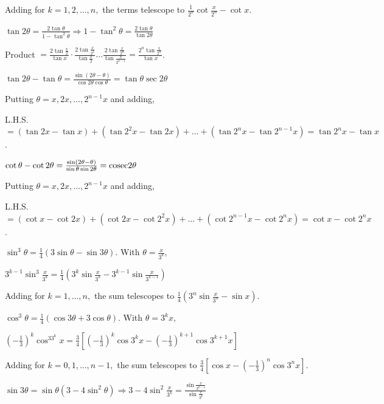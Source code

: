   Adding for $k = 1, 2, \ldots, n,$ the terms telescope to $\frac{1}{2^n}\cot\frac{x}{2^n} - \cot x$.

\item $\tan2\theta = \frac{2\tan\theta}{1 - \tan^2\theta} \Rightarrow 1 - \tan^2\theta = \frac{2\tan\theta}{\tan2\theta}$

  Product $= \frac{2\tan\frac{x}{2}}{\tan x}\cdot\frac{2\tan\frac{x}{2^2}}{\tan\frac{x}{2}}\ldots\frac{2\tan\frac{x}{2^n}}{\tan\frac{x}{2^{n
  - 1}}} = \frac{2^n\tan\frac{x}{2^n}}{\tan x}$.

\item $\tan2\theta - \tan\theta = \frac{\sin(2\theta - \theta)}{\cos2\theta\cos\theta} = \tan\theta\sec2\theta$

  Putting $\theta = x, 2x, \ldots, 2^{n - 1}x$ and adding,

  L.H.S. $= (\tan2x - \tan x) + (\tan2^2x - \tan2x) + \ldots + (\tan2^nx - \tan2^{n - 1}x) = \tan2^nx - \tan x$.

\item $\cot\theta - \cot2\theta = \frac{\sin(2\theta - \theta)}{\sin\theta\sin2\theta} = {\rm cosec} 2\theta$

  Putting $\theta = x, 2x, \ldots, 2^{n - 1}x$ and adding,

  L.H.S. $= (\cot x - \cot2x) + (\cot2x - \cot2^2x) + \ldots + (\cot2^{n - 1}x - \cot2^nx) = \cot x - \cot2^nx$.

\item $\sin^3\theta = \frac{1}{4}(3\sin\theta - \sin3\theta)$. With $\theta = \frac{x}{3^k},$

  $3^{k - 1}\sin^3\frac{x}{3^k} = \frac{1}{4}\left(3^k\sin\frac{x}{3^k} - 3^{k - 1}\sin\frac{x}{3^{k - 1}}\right)$

  Adding for $k = 1, \ldots, n,$ the sum telescopes to $\frac{1}{4}\left(3^n\sin\frac{x}{3^n} - \sin x\right)$.

\item $\cos^3\theta = \frac{1}{4}(\cos3\theta + 3\cos\theta)$. With $\theta = 3^kx,$

  $\left(-\frac{1}{3}\right)^k\cos^33^kx = \frac{3}{4}\left[\left(-\frac{1}{3}\right)^k\cos3^kx - \left(-\frac{1}{3}\right)^{k +
  1}\cos3^{k + 1}x\right]$

  Adding for $k = 0, 1, \ldots, n - 1,$ the sum telescopes to $\frac{3}{4}\left[\cos x - \left(-\frac{1}{3}\right)^n\cos3^nx\right]$.

\item $\sin3\theta = \sin\theta(3 - 4\sin^2\theta) \Rightarrow 3 - 4\sin^2\frac{x}{3^k} = \frac{\sin\frac{x}{3^{k -
  1}}}{\sin\frac{x}{3^k}}$

